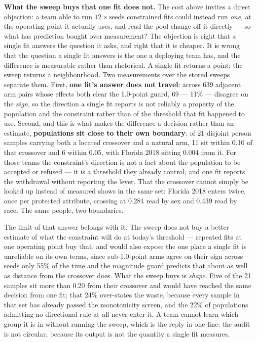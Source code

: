 \documentclass[9pt,conference]{IEEEtran}
\begin{document}
\textbf{What the sweep buys that one fit does not.} The cost above invites a direct
objection: a team able to run $12 \times \mathrm{seeds}$ constrained fits could instead run
\emph{one}, at the operating point it actually uses, and read the pool change off it
directly --- so what has prediction bought over measurement? The objection is right that a
single fit answers the question it asks, and right that it is cheaper. It is wrong that the
question a single fit answers is the one a deploying team has, and the difference is
measurable rather than rhetorical. A single fit returns a point; the sweep returns a
neighbourhood. Two measurements over the stored sweeps separate them. First, \textbf{one
fit's answer does not travel}: across 639 adjacent arm pairs whose effects both clear the
1.0-point guard, 69 --- 11\% --- disagree on the \emph{sign}, so the direction a single fit
reports is not reliably a property of the population and the constraint rather than of the
threshold that fit happened to use. Second, and this is what makes the difference a decision
rather than an estimate, \textbf{populations sit close to their own boundary}: of 21 disjoint
person samples carrying both a located crossover and a natural arm, 11 sit within 0.10 of
that crossover and 6 within 0.05, with Florida 2018 sitting 0.004 from it. For those teams
the constraint's direction is not a fact about the population to be accepted or refused ---
it is a threshold they already control, and one fit reports the withdrawal without reporting
the lever. That the crossover cannot simply be looked up instead of measured shows in the
same set: Florida 2018 enters twice, once per protected attribute, crossing at 0.284 read by
sex and 0.439 read by race. The same people, two boundaries.

The limit of that answer belongs with it. The sweep does not buy a better estimate of what
the constraint will do at today's threshold --- repeated fits at one operating point buy
that, and would also expose the one place a single fit is unreliable on its own terms, since
sub-1.0-point arms agree on their sign across seeds only 55\% of the time and the magnitude
guard predicts that about as well as distance from the crossover does. What the sweep buys
is \emph{shape}. Five of the 21 samples sit more than 0.20 from their crossover and would
have reached the same decision from one fit; that 24\% over-states the waste, because every
sample in that set has already passed the monotonicity screen, and the 22\% of populations
admitting no directional rule at all never enter it. A team cannot learn which group it is
in without running the sweep, which is the reply in one line: the audit is not circular,
because its output is not the quantity a single fit measures.
\end{document}
